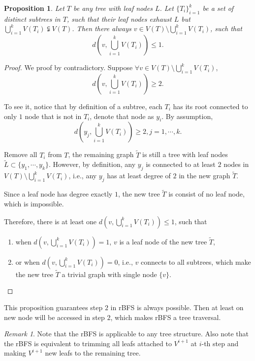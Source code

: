 \documentclass[11pt]{article}
\theoremstyle{definition}
\theoremstyle{remark}
\newtheorem{remark}[defn]{Remark}
\theoremstyle{plain}
\newtheorem{prop}[defn]{Proposition}
\begin{document}
\begin{prop}
	Let $T$ be any tree with leaf nodes $L$. Let $\{T_i\}_{i=1}^k$ be a set of distinct subtrees in $T$, such that their leaf nodes exhaust $L$ but $\bigcup_{i=1}^kV(T_i)\subsetneqq V(T)$. Then there always $v \in V(T)\setminus \bigcup_{i=1}^kV(T_i)$, such that 
	\[
		d\left(v,\bigcup_{i=1}^kV(T_i)\right) \leq 1.
	\]
\end{prop}
\begin{proof}
	We proof by contradictory. Suppose $\forall v \in V(T)\setminus \bigcup_{i=1}^kV(T_i)$,
	\[
		d\left(v,\bigcup_{i=1}^kV(T_i)\right) \geq 2.
	\]

	To see it, notice that by definition of a subtree, each $T_i$ has its root connected to only $1$ node that is not in $T_i$, denote that node as $y_i$. By assumption,
	\[
		d\left(y_j,\bigcup_{i=1}^kV(T_i)\right) \geq 2, j = 1,\cdots, k.
	\]

	Remove all $T_i$ from $T$, the remaining graph $\tilde{T}$ is still a tree with leaf nodes $\tilde{L} \subset \{y_1,\cdots, y_k\}$. However, by definition, any $y_j$ is connected to at least $2$ nodes in $V(T)\setminus \bigcup_{i=1}^kV(T_i)$, i.e., any $y_j$ has at least degree of $2$ in the new graph $\tilde{T}$.

	Since a leaf node has degree exactly $1$, the new tree $\tilde{T}$ is consist of no leaf node, which is impossible.

	Therefore, there is at least one $d\left(v,\bigcup_{i=1}^kV(T_i)\right) \leq 1$, such that
	\begin{enumerate}
		\item when $d\left(v,\bigcup_{i=1}^kV(T_i)\right) = 1$, $v$ is a leaf node of the new tree $\tilde{T}$,
		\item or when $d\left(v,\bigcup_{i=1}^kV(T_i)\right) = 0$, i.e., $v$ connects to all subtrees, which make the new tree $\tilde{T}$ a trivial graph with single node $\{v\}$.
	\end{enumerate}
\end{proof}

This proposition guarantees step $2$ in rBFS is always possible. Then at least on new node will be accessed in step $2$, which makes rBFS a tree traversal. 

\begin{remark}
	Note that the rBFS is applicable to any tree structure. Also note that the rBFS is equivalent to trimming all leafs attached to $V^{i+1}$ at $i$-th step and making $V^{i+1}$ new leafs to the remaining tree.
\end{remark}
\end{document}
